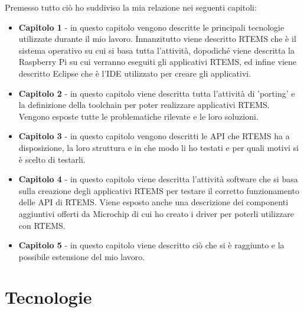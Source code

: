 \documentclass[12pt, a4paper, titlepage, oneside]{book}
\begin{document}
\begin{flushleft}
Premesso tutto ciò ho suddiviso la mia relazione nei seguenti capitoli:

\begin{itemize}
    \item \textbf{Capitolo 1} - in questo capitolo vengono descritte le principali tecnologie utilizzate durante il mio lavoro. Innanzitutto viene descritto RTEMS che è il sistema operativo su cui si basa tutta l'attività, dopodiché viene  descritta la Raspberry Pi su cui verranno eseguiti gli applicativi RTEMS, ed infine viene descritto Eclipse che è l'IDE utilizzato per creare gli applicativi.
    \item \textbf{Capitolo 2} - in questo capitolo viene descritta tutta l'attività di 'porting' e la definizione della toolchain per poter realizzare applicativi RTEMS. Vengono esposte tutte le problematiche rilevate e le loro soluzioni. 
    \item \textbf{Capitolo 3} - in questo capitolo vengono descritti le API che RTEMS ha a disposizione, la loro struttura e in che modo li ho testati e per quali motivi si è scelto di testarli.
    \item \textbf{Capitolo 4} - in questo capitolo viene descritta l'attività software che si basa sulla creazione degli applicativi RTEMS per testare il corretto funzionamento delle API di RTEMS. Viene esposto anche una descrizione dei componenti aggiuntivi offerti da Microchip di cui ho creato i driver per poterli utilizzare con RTEMS.
    \item \textbf{Capitolo 5} - in questo capitolo viene descritto ciò che si è raggiunto e la possibile estensione del mio lavoro.
\end{itemize} 
\chapter{Tecnologie}


\end{flushleft}
\end{document}

